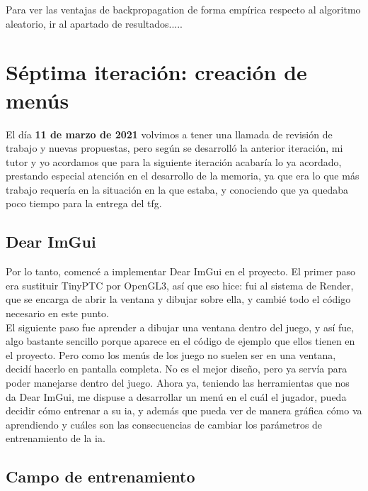 Para ver las ventajas de backpropagation de forma empírica respecto al algoritmo aleatorio, ir al apartado de resultados.....

\section{Séptima iteración: creación de menús}
El día \textbf{11 de marzo de 2021} volvimos a tener una llamada de revisión de trabajo y nuevas propuestas, pero según se desarrolló la anterior iteración, mi tutor y yo acordamos que para la siguiente iteración acabaría lo ya acordado, prestando especial atención en el desarrollo de la memoria, ya que era lo que más trabajo requería en la situación en la que estaba, y conociendo que ya quedaba poco tiempo para la entrega del \gls{tfg}.

\subsection{Dear ImGui}
Por lo tanto, comencé a implementar Dear ImGui en el proyecto. El primer paso era sustituir TinyPTC por OpenGL3, así que eso hice: fui al sistema de Render, que se encarga de abrir la ventana y dibujar sobre ella, y cambié todo el código necesario en este punto. 
\\
El siguiente paso fue aprender a dibujar una ventana dentro del juego, y así fue, algo bastante sencillo porque aparece en el código de ejemplo que ellos tienen en el proyecto.
Pero como los menús de los juego no suelen ser en una ventana, decidí hacerlo en pantalla completa. No es el mejor diseño, pero ya servía para poder manejarse  dentro del juego.
Ahora ya, teniendo las herramientas que nos da Dear ImGui, me dispuse a desarrollar un menú en el cuál el jugador, pueda decidir cómo entrenar a su \gls{ia}, y además que pueda ver de manera gráfica cómo va aprendiendo y cuáles son las consecuencias de cambiar los parámetros de entrenamiento de la \gls{ia}.

\subsection{Campo de entrenamiento}

